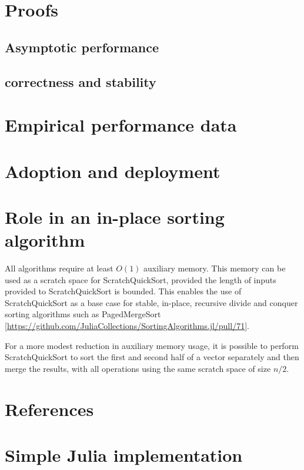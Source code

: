 \documentclass{juliacon}
\begin{document}
\section{Proofs}

\subsection{Asymptotic performance}

\subsection{correctness and stability}

\section{Empirical performance data}

\section{Adoption and deployment}

\section{Role in an in-place sorting algorithm}

All algorithms require at least $O(1)$ auxiliary memory. This memory can be used as a scratch space for ScratchQuickSort, provided the length of inputs provided to ScratchQuickSort is bounded. This enables the use of ScratchQuickSort as a base case for stable, in-place, recursive divide and conquer sorting algorithms such as PagedMergeSort \ref{https://github.com/JuliaCollections/SortingAlgorithms.jl/pull/71}.

For a more modest reduction in auxiliary memory usage, it is possible to perform ScratchQuickSort to sort the first and second half of a vector separately and then merge the results, with all operations using the same scratch space of size $n/2$.

\section{References}

\appendix

\section{Simple Julia implementation}
\end{document}
